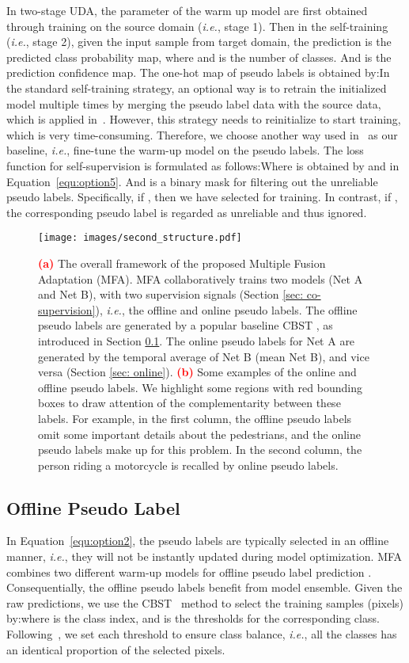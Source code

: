 \documentclass{bmvc2k}
\begin{document}
In two-stage UDA, the parameter  of the warm up model are first obtained through training on the source domain (\emph{i.e.}, stage 1). Then in the self-training (\emph{i.e.}, stage 2), given the input sample from target domain, the prediction  is the predicted class probability map, where   and  is the number of classes. And  is the prediction confidence map. The one-hot map of pseudo labels is obtained by:In the standard self-training strategy, an optional way is to retrain the initialized model multiple times by merging the pseudo label data with the source data, which is applied in~\cite{RN135,RN180}. However, this strategy needs to reinitialize  to start training, which is very time-consuming. Therefore, we choose another way used in~\cite{RN132} as our baseline, \emph{i.e.}, fine-tune the warm-up model on the pseudo labels. The loss function for self-supervision is formulated as follows:Where  is obtained by  and   in Equation~\ref{equ:option5}. And  is a binary mask for filtering out the unreliable pseudo labels. Specifically, if , then we have  selected for training. In contrast, if , the corresponding pseudo label is regarded as unreliable and thus ignored.

\begin{figure}[t]
\centering
\texttt{[image: images/second\_structure.pdf]}
\caption{\textbf{\textcolor{red}{(a)}} The overall framework of the proposed Multiple Fusion Adaptation (MFA). MFA collaboratively trains two models (Net A and Net B), with two supervision signals (Section \ref{sec: co-supervision}), \emph{i.e.}, the offline and online pseudo labels. The offline pseudo labels are generated by a popular baseline CBST \cite{RN162}, as introduced in Section \ref{sec: offline}. The online pseudo labels for Net A are generated by the temporal average of Net B (mean Net B), and vice versa (Section \ref{sec: online}).  \textbf{\textcolor{red}{(b)}} Some examples of the online and offline pseudo labels. 
We highlight some regions with red bounding boxes to draw attention of the complementarity between these labels. For example, in the first column, the offline pseudo labels omit some important details about the pedestrians, and the online pseudo labels make up for this problem. In the second column, the person riding a motorcycle is recalled by online pseudo labels.}
\label{image:learn_step}
\end{figure}
\subsection{Offline Pseudo Label}\label{sec: offline}
In Equation~\ref{equ:option2}, the pseudo labels are typically selected in an offline manner, \emph{i.e.}, they will not be instantly updated during model optimization. 
MFA combines two different warm-up models for offline pseudo label prediction . Consequentially, the offline pseudo labels benefit from model ensemble. Given the raw predictions, we use the CBST~\cite{RN162} method to select the training samples (pixels) by:where  is the class index, and  is the thresholds for the corresponding class. Following~\cite{RN162}, we set each threshold  to ensure class balance, \emph{i.e.}, all the classes has an identical proportion of the selected pixels.
\end{document}
